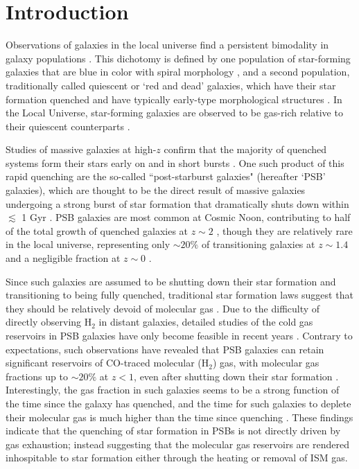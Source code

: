 \documentclass[twocolumn, linenumbers]{aastex631}
\newcommand{\hh}{\text{H}_2}
\begin{document}
\section{Introduction}
\label{sec:intro}
Observations of galaxies in the local universe find a persistent bimodality in galaxy populations \citep[e.g.][]{noeske,wuyts,Brammer11, Muzzin_2013,jin}.  This dichotomy is defined by one population of star-forming galaxies that are blue in color with spiral morphology \citep{saintonge, tacconi}, and a second population, traditionally called quiescent or `red and dead' galaxies, which have their star formation quenched and have typically early-type morphological structures \citep{blanton03, mcdermid}.  In the Local Universe, star-forming galaxies are observed to be gas-rich relative to their quiescent counterparts \citep{davis,young}.

Studies of massive galaxies at high-$z$ confirm that the majority of quenched systems form their stars early on and in short bursts \citep{carnall, Belli,merlin, suess21, laporte, Tacchella_2022}.  One such product of this rapid quenching are the so-called ``post-starburst galaxies" (hereafter `PSB' galaxies), which are thought to be the direct result of massive galaxies undergoing a strong burst of star formation that dramatically shuts down within $\lesssim$ 1 Gyr \citep{dressler, zabludoff, goto05, goto07, yang, kriek10, wild20, french_2021}.  PSB galaxies are most common at Cosmic Noon, contributing to half of the total growth of quenched galaxies at $z\sim 2$ \citep{Belli}, though they are relatively rare in the local universe, representing only $\sim 20\%$ of transitioning galaxies at $z\sim 1.4$ and a negligible fraction at $z\sim 0$ \citep{tran,whitaker12,wild16, Lotz21,Setton_2023, smercina, park24}. 

Since such galaxies are assumed to be shutting down their star formation and transitioning to being fully quenched, traditional star formation laws suggest that they should be relatively devoid of molecular gas \citep[e.g.][]{Kennicut, shmidt}.  Due to the difficulty of directly observing $\hh$ in distant galaxies, detailed studies of the cold gas reservoirs in PSB galaxies have only become feasible in recent years \citep{rowlands, french_2015, Alatalo, alatalo17,suessSquiggle, setton2025}. Contrary to expectations, such observations have revealed that PSB galaxies can retain significant reservoirs of CO-traced molecular (H$_2$) gas, with molecular gas fractions up to $\sim 20\%$ at $z<1$, even after shutting down their star formation \citep{young, suess_2017, French_2018, Bezanson_2022, Baron22, setton2025, Umehata2025}.  Interestingly, the gas fraction in such galaxies seems to be a strong function of the time since the galaxy has quenched, and the time for such galaxies to deplete their molecular gas is much higher than the time since quenching \citep{suess2025}.  These findings indicate that the quenching of star formation in PSBs is not directly driven by gas exhaustion; instead suggesting that the molecular gas reservoirs are rendered inhospitable to star formation either through the heating or removal of ISM gas.
\end{document}
